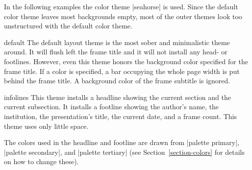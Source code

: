 In the following examples the color theme |seahorse| is used. Since the default color theme leaves most backgrounds empty, most of the outer themes look too unstructured with the default color theme.

\begin{outerthemeexample}{default}
  The default layout theme is the most sober and minimalistic theme around. It will flush left the frame title and it will not install any head- or footlines. However, even this theme honors the background color specified for the frame title. If a color is specified, a bar occupying the whole page width is put behind the frame title. A background color of the frame subtitle is ignored.
\end{outerthemeexample}

\begin{outerthemeexample}{infolines}
  This theme installs a headline showing the current section and the current subsection. It installs a footline showing the author's name, the institution, the presentation's title, the current date, and a frame count. This theme uses only little space.

  The colors used in the headline and footline are drawn from |palette primary|, |palette secondary|, and |palette tertiary| (see Section~\ref{section-colors} for details on how to change these).
\end{outerthemeexample}

